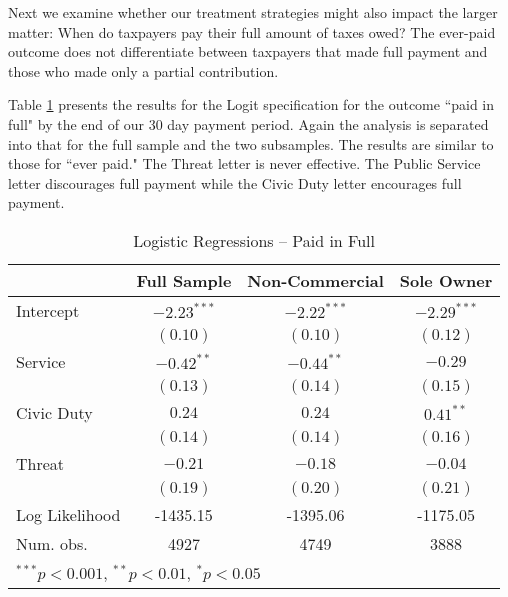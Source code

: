 \documentclass[12pt,titlepage]{article}
\begin{document}
	Next we examine whether our treatment strategies might also impact the larger matter: When do taxpayers pay their full amount of taxes owed?  The ever-paid outcome does not differentiate between taxpayers that made full payment and those who made only a partial contribution.  

Table \ref{VV} presents the results for the Logit specification for the outcome ``paid in full" by the end of our 30 day payment period.   Again the analysis is separated into that for the full sample and the two subsamples.  The results are similar to those for ``ever paid."  The Threat letter is never effective.  The Public Service letter discourages full payment while the Civic Duty letter encourages full payment.  


\begin{table}[htbp]
\caption{Logistic Regressions -- Paid in Full}\label{VV}
\begin{center}
\begin{tabular}{| l c | c | c | }
\hline
               & Full Sample & Non-Commercial & Sole Owner \\
\hline
Intercept      & $-2.23^{***}$ & $-2.22^{***}$ & $-2.29^{***}$ \\
               & $(0.10)$      & $(0.10)$      & $(0.12)$      \\
Service          & $-0.42^{**}$  & $-0.44^{**}$  & $-0.29$       \\
               & $(0.13)$      & $(0.14)$      & $(0.15)$      \\
Civic Duty           & $0.24$        & $0.24$        & $0.41^{**}$   \\
               & $(0.14)$      & $(0.14)$      & $(0.16)$      \\
Threat         & $-0.21$       & $-0.18$       & $-0.04$       \\
               & $(0.19)$      & $(0.20)$      & $(0.21)$      \\
\hline
Log Likelihood & -1435.15      & -1395.06      & -1175.05      \\
Num. obs.      & 4927          & 4749          & 3888          \\
\hline
\multicolumn{4}{l}{\scriptsize{$^{***}p<0.001$, $^{**}p<0.01$, $^*p<0.05$}}
\end{tabular}
\end{center}
\end{table}
\end{document}
